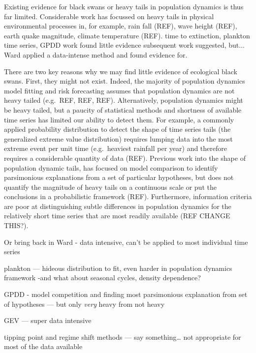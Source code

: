 Existing evidence for black swans or heavy tails in population dynamics is thus
far limited. Considerable work has focussed on heavy tails in physical
environmental processes in, for example, rain fall (REF), wave height (REF),
earth quake magnitude, climate temperature (REF). time to extinction, plankton
time series, GPDD work found little evidence subsequent work suggested, but...
Ward applied a data-intense method and found evidence for.

There are two key reasons why we may find little evidence of ecological black
swans. First, they might not exist. Indeed, the majority of population
dynamics model fitting and risk forecasting assumes that population dynamics
are not heavy tailed (e.g.~REF, REF, REF). Alternatively, population dynamics
might be heavy tailed, but a paucity of statistical methods and shortness of
available time series has limited our ability to detect them. For example,
a commonly applied probability distribution to detect the shape of time series
tails (the generalized extreme value distribution) requires lumping data into
the most extreme event per unit time (e.g.~heaviest rainfall per year) and
therefore requires a considerable quantity of data (REF). Previous work into
the shape of population dynamic tails, has focused on model comparison to
identify parsimonious explanations from a set of particular hypotheses, but
does not quantify the magnitude of heavy tails on a continuous scale or put the
conclusions in a probabilistic framework (REF). Furthermore, information
criteria are poor at distinguishing subtle differences in population dynamics
for the relatively short time series that are most readily available (REF CHANGE
THIS?).

Or bring back in Ward - data intensive, can't be applied to most individual
time series

plankton --- hideous distribution to fit, even harder in population dynamics
framework -and what about seasonal cycles, density dependence?

GPDD - model competition and finding most parsimonious explanation from set of
hypotheses --- but only \emph{very} heavy from not heavy

GEV --- super data intensive

tipping point and regime shift methods --- say something\ldots{} not
appropriate for most of the data available

